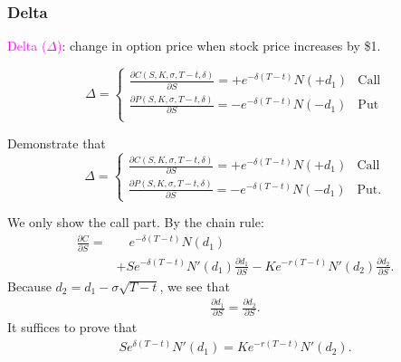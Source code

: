 \begin{frame}[fragile]
	\frametitle{Delta}
	\centering

	\textcolor{magenta}{Delta ($\Delta$)}: change in option price when stock price increases by \$1.
	\bigskip

	\begin{equation*}
		\Delta =
		\begin{cases}
			\displaystyle \frac{\partial C(S,K,\sigma,T-t,\delta)}{\partial S} = +e^{-\delta(T-t)} N(+d_1) & \text{Call} \\[1em]
			\displaystyle \frac{\partial P(S,K,\sigma,T-t,\delta)}{\partial S} = -e^{-\delta(T-t)} N(-d_1) & \text{Put}  \\
		\end{cases}
	\end{equation*}
\end{frame}
\begin{frame}[fragile,t]
\begin{myexample}
	Demonstrate that
	\begin{equation*}
		\Delta =
		\begin{cases}
			\displaystyle \frac{\partial C(S,K,\sigma,T-t,\delta)}{\partial S} = +e^{-\delta(T-t)} N(+d_1) & \text{Call} \\[1em]
			\displaystyle \frac{\partial P(S,K,\sigma,T-t,\delta)}{\partial S} = -e^{-\delta(T-t)} N(-d_1) & \text{Put}.
		\end{cases}
	\end{equation*}
\end{myexample}
\begin{mysol}
	We only show the call part. By the chain rule:
	\begin{align*}
		\frac{\partial C}{\partial S} = & \quad e^{-\delta (T-t)} N(d_1) \\
                                    & + S e^{-\delta (T-t)} N'(d_1) \frac{\partial d_1}{\partial S} - K e^{-r (T-t)} N'(d_2) \frac{\partial d_2}{\partial S}.
	\end{align*}
	Because $d_2 = d_1 - \sigma \sqrt{T-t}$, we see that
	\begin{align*}
		\frac{\partial d_1}{\partial S} = \frac{\partial d_2}{\partial S}.
	\end{align*}
	It suffices to prove that
	\begin{align*}
		Se^{\delta (T-t)} N'(d_1) = K e^{-r (T-t)} N'(d_2).
	\end{align*}
\end{mysol}
\end{frame}
